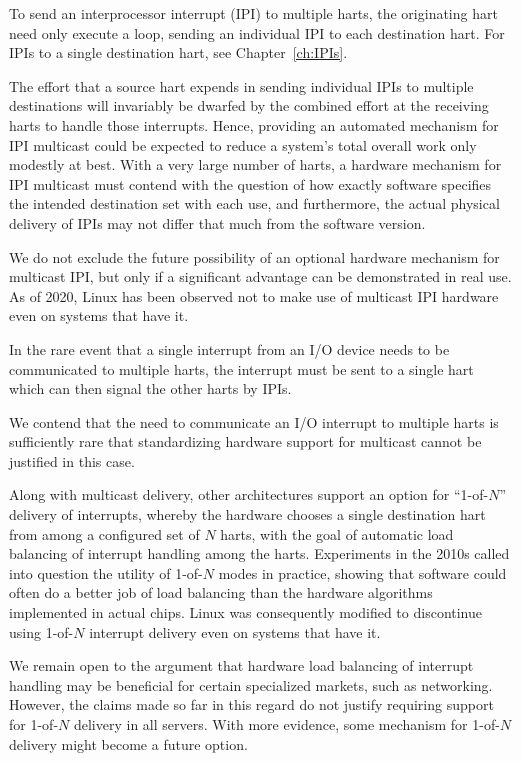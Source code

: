 To send an interprocessor interrupt (IPI) to multiple harts, the
originating hart need only execute a loop, sending an individual IPI to
each destination hart.
For IPIs to a single destination hart, see Chapter~\ref{ch:IPIs}.

\begin{commentary}
The effort that a source hart expends in sending individual IPIs to
multiple destinations will invariably be dwarfed by the combined effort
at the receiving harts to handle those interrupts.
Hence, providing an automated mechanism for IPI multicast could be
expected to reduce a system's total overall work only modestly at best.
With a very large number of harts, a hardware mechanism for IPI
multicast must contend with the question of how exactly software
specifies the intended destination set with each use, and furthermore,
the actual physical delivery of IPIs may not differ that much from the
software version.

We do not exclude the future possibility of an optional hardware
mechanism for multicast IPI, but only if a significant advantage can be
demonstrated in real use.
As of 2020, Linux has been observed not to make use of multicast IPI
hardware even on systems that have it.
\end{commentary}

In the rare event that a single interrupt from an I/O device needs
to be communicated to multiple harts, the interrupt must be sent to a
single hart which can then signal the other harts by IPIs.

\begin{commentary}
We contend that the need to communicate an I/O interrupt to multiple
harts is sufficiently rare that standardizing hardware support for multicast
cannot be justified in this case.
\end{commentary}

\begin{commentary}
Along with multicast delivery, other architectures support an option
for ``\mbox{1-of-$N$}'' delivery of interrupts, whereby the hardware
chooses a single destination hart from among a configured set of
$N$ harts, with the goal of automatic load balancing of interrupt
handling among the harts.
Experiments in the 2010s called into question the utility of
\mbox{1-of-$N$} modes in practice, showing that software could often do
a better job of load balancing than the hardware algorithms implemented
in actual chips.
Linux was consequently modified to discontinue using \mbox{1-of-$N$}
interrupt delivery even on systems that have it.

We remain open to the argument that hardware load balancing of
interrupt handling may be beneficial for certain specialized markets,
such as networking.
However, the claims made so far in this regard do not justify requiring
support for \mbox{1-of-$N$} delivery in all {\RISCV} servers.
With more evidence, some mechanism for \mbox{1-of-$N$} delivery might
become a future option.
\end{commentary}

